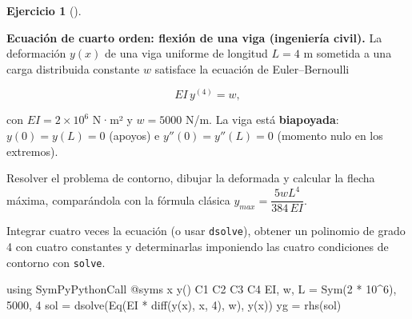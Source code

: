 \documentclass[
  spanish,
  a4paper,
]{scrreport}
\newenvironment{Shaded}{\begin{snugshade}}{\end{snugshade}}
\newcommand{\BuiltInTok}[1]{\textcolor[rgb]{0.00,0.23,0.31}{#1}}
\newcommand{\FloatTok}[1]{\textcolor[rgb]{0.68,0.00,0.00}{#1}}
\newcommand{\FunctionTok}[1]{\textcolor[rgb]{0.28,0.35,0.67}{#1}}
\newcommand{\ImportTok}[1]{\textcolor[rgb]{0.00,0.46,0.62}{#1}}
\newcommand{\NormalTok}[1]{\textcolor[rgb]{0.00,0.23,0.31}{#1}}
\newcommand{\OperatorTok}[1]{\textcolor[rgb]{0.37,0.37,0.37}{#1}}
\newcommand{\PreprocessorTok}[1]{\textcolor[rgb]{0.68,0.00,0.00}{#1}}
\theoremstyle{definition}
\newtheorem{exercise}{Ejercicio}[chapter]
\theoremstyle{remark}
\begin{document}
\begin{exercise}[]\protect\hypertarget{exr-viga}{}\label{exr-viga}

\textbf{Ecuación de cuarto orden: flexión de una viga (ingeniería
civil).} La deformación \(y(x)\) de una viga uniforme de longitud
\(L = 4\) m sometida a una carga distribuida constante \(w\) satisface
la ecuación de Euler--Bernoulli

\[
EI\,y^{(4)} = w,
\]

con \(EI = 2\times 10^6\) N·m² y \(w = 5000\) N/m. La viga está
\textbf{biapoyada}: \(y(0)=y(L)=0\) (apoyos) e \(y''(0)=y''(L)=0\)
(momento nulo en los extremos).

Resolver el problema de contorno, dibujar la deformada y calcular la
flecha máxima, comparándola con la fórmula clásica
\(y_{max} = \dfrac{5wL^4}{384\,EI}\).

\begin{tcolorbox}[enhanced jigsaw, arc=.35mm, bottomrule=.15mm, bottomtitle=1mm, breakable, colback=white, colbacktitle=quarto-callout-note-color!10!white, colframe=quarto-callout-note-color-frame, coltitle=black, left=2mm, leftrule=.75mm, opacityback=0, opacitybacktitle=0.6, rightrule=.15mm, title=\textcolor{quarto-callout-note-color}{\faInfo}\hspace{0.5em}{Ayuda}, titlerule=0mm, toprule=.15mm, toptitle=1mm]

Integrar cuatro veces la ecuación (o usar \texttt{dsolve}), obtener un
polinomio de grado 4 con cuatro constantes y determinarlas imponiendo
las cuatro condiciones de contorno con \texttt{solve}.

\end{tcolorbox}

\begin{tcolorbox}[enhanced jigsaw, arc=.35mm, bottomrule=.15mm, bottomtitle=1mm, breakable, colback=white, colbacktitle=quarto-callout-tip-color!10!white, colframe=quarto-callout-tip-color-frame, coltitle=black, left=2mm, leftrule=.75mm, opacityback=0, opacitybacktitle=0.6, rightrule=.15mm, title=\textcolor{quarto-callout-tip-color}{\faLightbulb}\hspace{0.5em}{Solución}, titlerule=0mm, toprule=.15mm, toptitle=1mm]

\begin{Shaded}
\begin{Highlighting}[]
\ImportTok{using} \BuiltInTok{SymPyPythonCall}
\PreprocessorTok{@syms}\NormalTok{ x }\FunctionTok{y}\NormalTok{() C1 C2 C3 C4}
\NormalTok{EI, w, L }\OperatorTok{=} \FunctionTok{Sym}\NormalTok{(}\FloatTok{2} \OperatorTok{*} \FloatTok{10}\OperatorTok{\^{}}\FloatTok{6}\NormalTok{), }\FloatTok{5000}\NormalTok{, }\FloatTok{4}
\NormalTok{sol }\OperatorTok{=} \FunctionTok{dsolve}\NormalTok{(}\FunctionTok{Eq}\NormalTok{(EI }\OperatorTok{*} \FunctionTok{diff}\NormalTok{(}\FunctionTok{y}\NormalTok{(x), x, }\FloatTok{4}\NormalTok{), w), }\FunctionTok{y}\NormalTok{(x))}
\NormalTok{yg }\OperatorTok{=} \FunctionTok{rhs}\NormalTok{(sol)}
\end{Highlighting}
\end{Shaded}


\end{tcolorbox}
\end{exercise}
\end{document}
